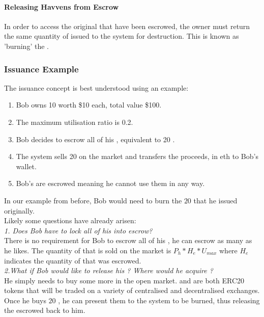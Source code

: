 \paragraph{Releasing Havvens from Escrow}

\noindent In order to access the original \HAV{} that have been escrowed, the owner must return the same quantity of issued \NOM{} to the system for destruction. This is known as 'burning' the \NOM{}.


\subsubsection{Issuance Example}

\noindent The issuance concept is best understood using an example:
\begin{enumerate}
\item{Bob owns 10 \HAV{} worth \$10 each, total value \$100.}
\item{The maximum utilisation ratio is 0.2.}
\item{Bob decides to escrow all of his \HAV{}, equivalent to 20 \NOM{}.}
\item{The system sells 20 \NOM{} on the market and transfers the proceeds, in eth to Bob's wallet.}
\item{Bob's \HAV{} are escrowed meaning he cannot use them in any way.}
\end{enumerate} 

\newpage

\noindent In our example from before, Bob would need to burn the $20$ \NOM{} that he issued originally. \\

\noindent Likely some questions have already arisen: \\

\noindent \emph{1. Does Bob have to lock all of his \HAV{} into escrow?} \\ 

\noindent There is no requirement for Bob to escrow all of his \HAV{}, he can escrow as many as he likes. The quantity of \NOM{} that is sold on the market is $ P_h * H_e * U_{max} $ where $H_e$ indicates the quantity of \HAV{} that was escrowed. \\

\noindent \emph{2.What if Bob would like to release his \HAV{}? Where would he acquire \NOM{}?} \\ 

\noindent He simply needs to buy some more in the open market. \HAV{} and \NOM{} are both ERC20 tokens that will be traded on a variety of centralised and decentralised exchanges. Once he buys $20$ \NOM{}, he can present them to the system to be burned, thus releasing the escrowed \HAV{} back to him. \\ 

